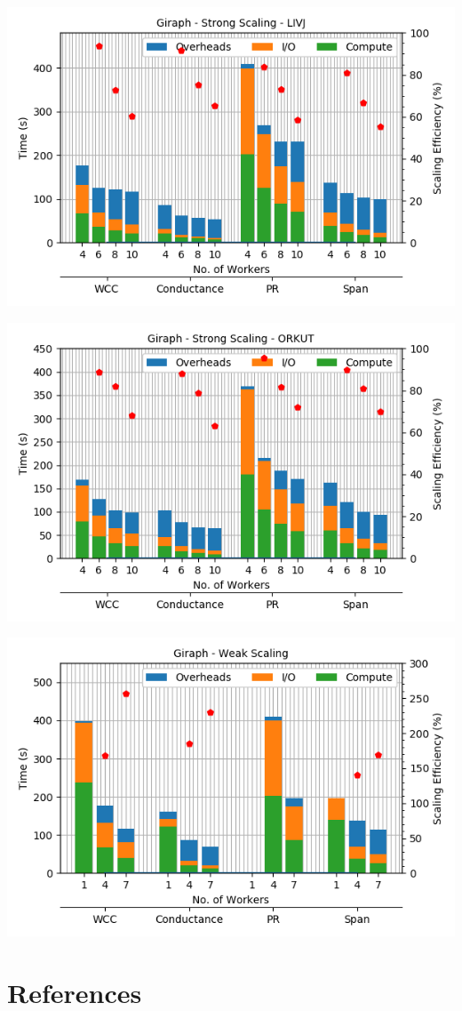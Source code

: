 \documentclass[11pt,a4paper,oneside]{article}
\begin{document}
    \begin{center}
    	\includegraphics[scale=0.6]{2.png}		
    \end{center}

    \begin{center}
    	\includegraphics[scale=0.6]{3.png}		
    \end{center}

    \begin{center}
    	\includegraphics[scale=0.6]{4.png}		
    \end{center}
        
    \section{References}
    \begin{list}{}{}
    	\item
    	\item
    \end{list}  
    
\end{document}
